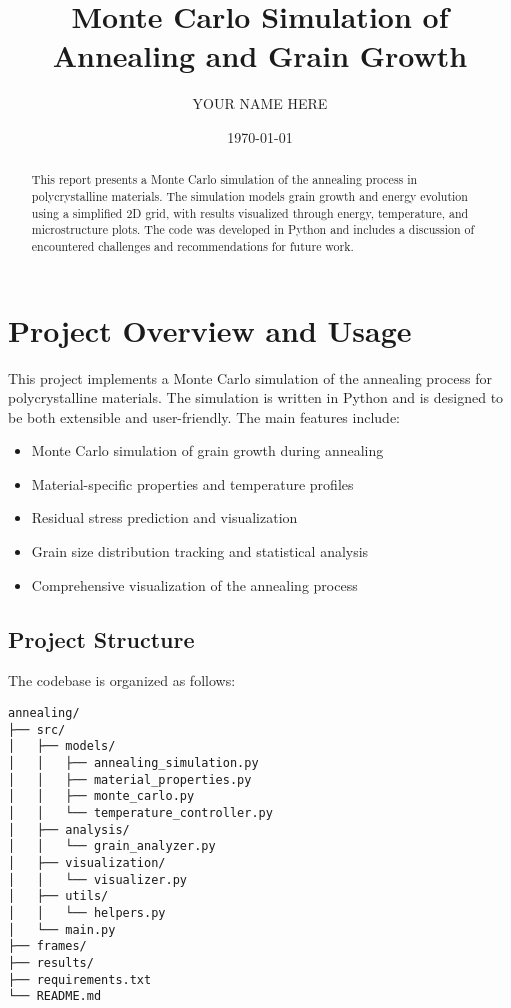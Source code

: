 \documentclass[12pt]{article}
\title{Monte Carlo Simulation of Annealing and Grain Growth}
\author{YOUR NAME HERE}
\date{\today}
\begin{document}
\maketitle

\begin{abstract}
This report presents a Monte Carlo simulation of the annealing process in polycrystalline materials. The simulation models grain growth and energy evolution using a simplified 2D grid, with results visualized through energy, temperature, and microstructure plots. The code was developed in Python and includes a discussion of encountered challenges and recommendations for future work.
\end{abstract}

\section{Project Overview and Usage}
This project implements a Monte Carlo simulation of the annealing process for polycrystalline materials. The simulation is written in Python and is designed to be both extensible and user-friendly. The main features include:
\begin{itemize}
    \item Monte Carlo simulation of grain growth during annealing
    \item Material-specific properties and temperature profiles
    \item Residual stress prediction and visualization
    \item Grain size distribution tracking and statistical analysis
    \item Comprehensive visualization of the annealing process
\end{itemize}

\subsection{Project Structure}
The codebase is organized as follows:
\begin{verbatim}
annealing/
├── src/
│   ├── models/
│   │   ├── annealing_simulation.py
│   │   ├── material_properties.py
│   │   ├── monte_carlo.py
│   │   └── temperature_controller.py
│   ├── analysis/
│   │   └── grain_analyzer.py
│   ├── visualization/
│   │   └── visualizer.py
│   ├── utils/
│   │   └── helpers.py
│   └── main.py
├── frames/
├── results/
├── requirements.txt
└── README.md
\end{verbatim}
\end{document}
